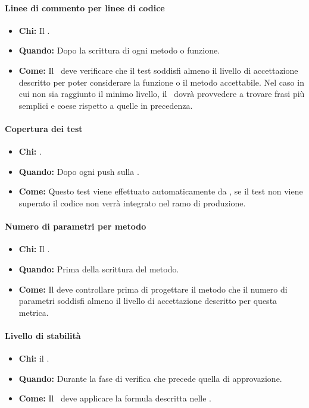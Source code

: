 \paragraph{Linee di commento per linee di codice}
\begin{itemize}
\item \textbf{Chi:} Il \Progr.
\item \textbf{Quando:} Dopo la scrittura di ogni metodo o funzione.
\item \textbf{Come:} Il \Progr\ deve verificare che il test soddisfi almeno il livello di accettazione descritto per poter considerare la funzione o il metodo accettabile. Nel caso in cui non sia raggiunto il minimo livello, il \Prog\ dovrà provvedere a trovare frasi più semplici e coese rispetto a quelle in precedenza. 
\end{itemize}

\paragraph{Copertura dei test}
\begin{itemize}
\item \textbf{Chi:} .
\item \textbf{Quando:} Dopo ogni push sulla .
\item \textbf{Come:} Questo test viene effettuato automaticamente da , se il test non viene superato il codice non verrà integrato nel ramo di produzione.
\end{itemize}

\paragraph{Numero di parametri per metodo}
\begin{itemize}
\item \textbf{Chi:} Il \Prog.
\item \textbf{Quando:} Prima della scrittura del metodo.
\item \textbf{Come:} Il \Prog deve controllare prima di progettare il metodo che il numero di parametri soddisfi almeno il livello di accettazione descritto per questa metrica.
\end{itemize}

\paragraph{Livello di stabilità}
\begin{itemize}
\item \textbf{Chi:} il \Ver.
\item \textbf{Quando:} Durante la fase di verifica che precede quella di approvazione.
\item \textbf{Come:} Il \Ver\ deve applicare la formula descritta nelle \NdP.
\end{itemize}